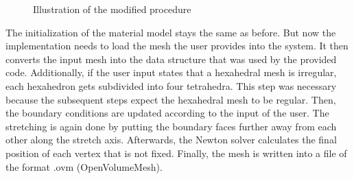 \begin{figure}[!htb]
\centering
{}
\caption{Illustration of the modified procedure} \label{fig:procedure_generalization}
\end{figure}

The initialization of the material model stays the same as before. But now the implementation needs to load the mesh the user provides into the system. It then converts the input mesh into the data structure that was used by the provided code. Additionally, if the user input states that a hexahedral mesh is irregular, each hexahedron gets subdivided into four tetrahedra. This step was necessary because the subsequent steps expect the hexahedral mesh to be regular. Then, the boundary conditions are updated according to the input of the user. The stretching is again done by putting the boundary faces further away from each other along the stretch axis. Afterwards, the Newton solver calculates the final position of each vertex that is not fixed. Finally, the mesh is written into a file of the format .ovm (OpenVolumeMesh).

